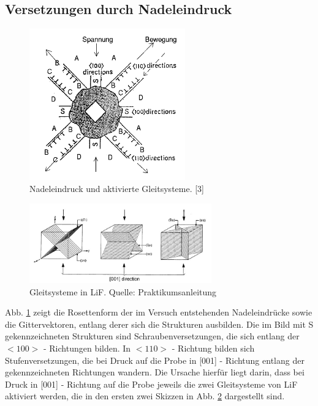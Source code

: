     \subsection{Versetzungen durch Nadeleindruck}
	\begin{figure}[H]
            \centering
            \includegraphics[width=0.6\textwidth]{Images/Question3.PNG}
            \caption{Nadeleindruck und aktivierte Gleitsysteme. [3]}
            \label{FigNadel}
        \end{figure}

	\begin{figure}[H]
            \centering
            \includegraphics[width=0.7\textwidth]{Images/Gleitsysteme.JPG}
            \caption{Gleitsysteme in LiF. Quelle: Praktikumsanleitung}
            \label{FigGleitGel}
        \end{figure}
	
	Abb. \ref{FigNadel} zeigt die Rosettenform der im Versuch entstehenden Nadeleindrücke sowie die Gittervektoren, entlang derer sich die Strukturen ausbilden. 
	Die im Bild mit S gekennzeichneten Strukturen sind Schraubenversetzungen, die sich entlang der $<100>$ - Richtungen bilden. In $<110>$ - Richtung bilden sich
	Stufenversetzungen, die bei Druck auf die Probe in [001] - Richtung entlang der gekennzeichneten Richtungen wandern. Die Ursache hierfür liegt
	darin, dass bei Druck in [001] - Richtung auf die Probe jeweils die zwei Gleitsysteme von LiF aktiviert werden, die in den ersten zwei Skizzen in Abb. 
	\ref{FigGleitGel} dargestellt sind.
	


